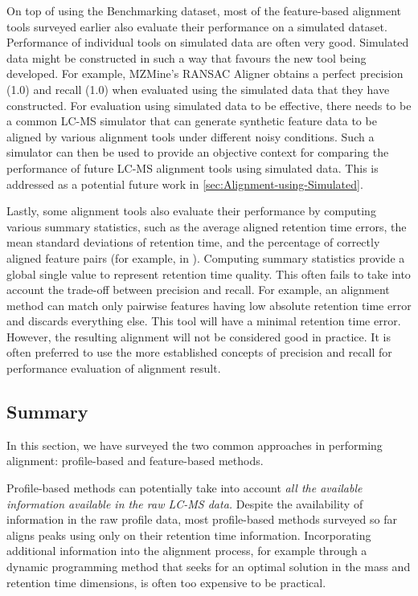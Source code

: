 On top of using the Benchmarking dataset, most of the feature-based alignment tools surveyed earlier also evaluate their performance on a simulated dataset. Performance of individual tools on simulated data are often very good. Simulated data might be constructed in such a way that favours the new tool being developed. For example, MZMine's RANSAC Aligner \cite{Pluskal2010} obtains a perfect precision (1.0) and recall (1.0) when evaluated using the simulated data that they have constructed. For evaluation using simulated data to be effective, there needs to be a common LC-MS simulator that can generate synthetic feature data to be aligned by various alignment tools under different noisy conditions. Such a simulator can then be used to provide an objective context for comparing the performance of future LC-MS alignment tools using simulated data. This is addressed as a potential future work in \ref{sec:Alignment-using-Simulated}.

Lastly, some alignment tools also evaluate their performance by computing various summary statistics, such as the average aligned retention time errors, the mean standard deviations of retention time, and the percentage of correctly aligned feature pairs (for example, in \cite{Lin2013,Podwojski2009}). Computing summary statistics provide a global single value to represent retention time quality. This often fails to take into account the trade-off between precision and recall. For example, an alignment method can match only pairwise features having low absolute retention time error and discards everything else. This tool will have a minimal retention time error. However, the resulting alignment will not be considered good in practice. It is often preferred to use the more established concepts of precision and recall for performance evaluation of alignment result.

\subsection{Summary}

In this section, we have surveyed the two common approaches in performing alignment: profile-based and feature-based methods.

Profile-based methods can potentially take into account \emph{all the available information available in the raw LC-MS data.} Despite the availability of information in the raw profile data, most profile-based methods surveyed so far aligns peaks using only on their retention time information. Incorporating additional information into the alignment process, for example through a dynamic programming method that seeks for an optimal solution in the mass and retention time dimensions, is often too expensive to be practical.

